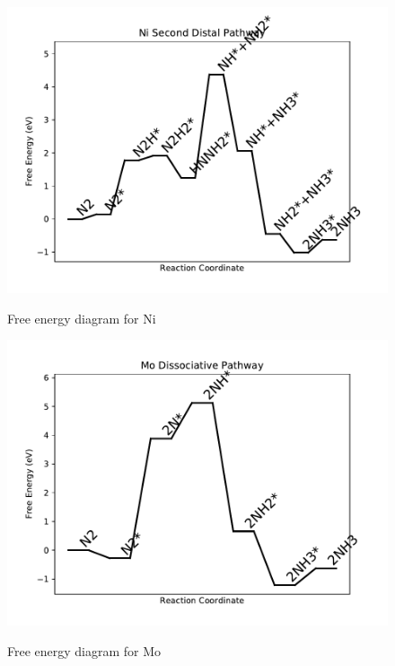 \documentclass{article}
\begin{document}
\begin{figure}
\includegraphics[width=1\linewidth]{data/plots/Ni_distal_2.pdf}
\label{fig:Ni_distal_2}
\caption{Free energy diagram for Ni}
\end{figure}

\clearpage
\begin{figure}
\includegraphics[width=1\linewidth]{data/plots/Mo_dissociative.pdf}
\label{fig:Mo_dissociative}
\caption{Free energy diagram for Mo}
\end{figure}
\end{document}
